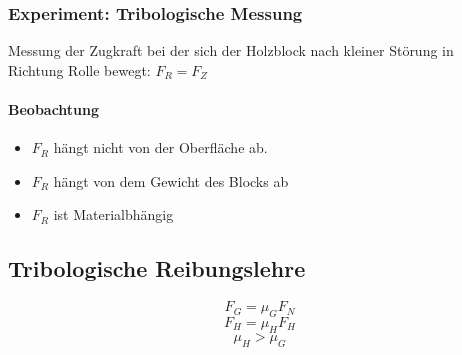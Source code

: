 \documentclass[a4paper]{scrartcl}
\begin{document}

\subsubsection{Experiment: Tribologische Messung}
\label{sec-8-7-2}
Messung der Zugkraft bei der sich der Holzblock nach kleiner Störung in Richtung Rolle bewegt: $F_R = F_Z$
\paragraph{Beobachtung}
\label{sec-8-7-2-1}
\begin{itemize}
\item $F_R$ hängt nicht von der Oberfläche ab.
\item $F_R$ hängt von dem Gewicht des Blocks ab
\item $F_R$ ist Materialbhängig
\end{itemize}

\subsection{Tribologische Reibungslehre}
\label{sec-8-8}
\[F_G = \mu_G F_N \tag{$\mu_G=$ Gleitreibungskraft}\]
\[F_H = \mu_H F_H \tag{$\mu_H=$ Haftreibungskraft}\]
\[\mu_H > \mu_G\]
\end{document}
